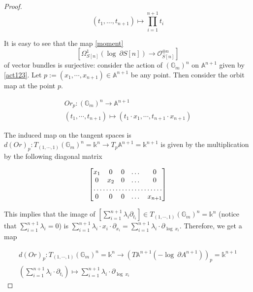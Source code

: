 \documentclass[11pt]{amsart}
\theoremstyle{plain}
\numberwithin{equation}{section}
\theoremstyle{definition}
\theoremstyle{plain}
\begin{document}
\begin{proof}
\begin{equation}\label{act}
(t_1, \dots, t_{n+1})\mapsto \prod^{n+1}_{i=1} t_i
\end{equation}

It is easy to see that the map \eqref{moment} 
\begin{equation}
\left[\Omega_{S[n]}^{1}(\log ~\partial S[n])\longrightarrow \mathcal O_{S[n]}^{\oplus n}\right]
\end{equation} 
of vector bundles is surjective: consider the action of $(\mathbb G_m)^n$ on $\mathbb A^{n+1}$ given by \eqref{act123}. Let $p:=(x_1, \cdots, x_{n+1})\in \mathbb A^{n+1}$ be any point. Then consider the orbit map at the point $p$. 

\begin{align}
    Or_p: (\mathbb G_m)^n\longrightarrow \mathbb A^{n+1}\\
    (t_1, \cdots, t_{n+1})\mapsto (t_1\cdot x_1, \cdots, t_{n+1}\cdot x_{n+1})
\end{align}

The induced map on the tangent spaces is $d(Or)_p: T_{(1,\cdots, 1)}(\mathbb G_m)^n=\mathbb k^n\longrightarrow T_p \mathbb A^{n+1}=\mathbb k^{n+1}$ is given by the multiplication by the following diagonal matrix

\smallskip

\[
\begin{bmatrix}
    x_1       & 0 & 0 & \dots & 0 \\
    0       & x_2 & 0 & \dots & 0 \\
    \hdotsfor{5} \\
    0       & 0 & 0 & \dots & x_{n+1}
\end{bmatrix}
\]

\smallskip

This implies that the image of $[\sum^{n+1}_{i=1} \lambda_i \partial_{t_i}]\in T_{(1,\cdots, 1)}(\mathbb G_m)^n=\mathbb k^n$ (notice that $\sum^{n+1}_{i=1} \lambda_i=0$) is $\sum^{n+1}_{i=1} \lambda_i\cdot x_i \cdot \partial_{x_i}=\sum^{n+1}_{i=1} \lambda_i\cdot \partial_{\log~x_i}$. Therefore, we get a map 

\begin{align}
    d(Or)_p: T_{(1,\cdots, 1)}(\mathbb G_m)^n=\mathbb k^n\longrightarrow (T \mathbb A^{n+1}(-\log~\partial A^{n+1}))_p=\mathbb k^{n+1}\\
    (\sum^{n+1}_{i=1} \lambda_i\cdot \partial_{t_i})\mapsto \sum^{n+1}_{i=1} \lambda_i\cdot \partial_{\log~x_i}
\end{align}


\end{proof}
\end{document}
